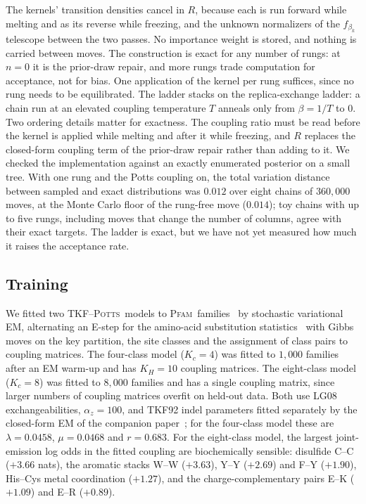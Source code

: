 \documentclass[11pt]{article}
\newcommand{\Potts}{\textsc{TKF--Potts}}
\newcommand{\Pfam}{\textsc{Pfam}}
\begin{document}
The kernels' transition densities cancel in $R$, because each is run forward
while melting and as its reverse while freezing, and the unknown normalizers
of the $f_{\beta_k}$ telescope between the two passes. No importance weight is
stored, and nothing is carried between moves. The construction is exact for
any number of rungs: at $n=0$ it is the prior-draw repair, and more rungs
trade computation for acceptance, not for bias. One application of the kernel
per rung suffices, since no rung needs to be equilibrated. The ladder stacks
on the replica-exchange ladder: a chain run at an elevated coupling
temperature $T$ anneals only from $\beta=1/T$ to $0$. Two ordering details
matter for exactness. The coupling ratio must be read before the kernel is
applied while melting and after it while freezing, and $R$ replaces the
closed-form coupling term of the prior-draw repair rather than adding to it.
We checked the implementation against an exactly enumerated posterior on a
small tree. With one rung and the Potts coupling on, the total variation
distance between sampled and exact distributions was $0.012$ over eight
chains of $360{,}000$ moves, at the Monte Carlo floor of the rung-free move
($0.014$); toy chains with up to five rungs, including moves that change the
number of columns, agree with their exact targets. The ladder is exact, but
we have not yet measured how much it raises the acceptance rate.

\subsection{Training}
\label{sec:training}

We fitted two \Potts\ models to \Pfam\ families~\citep{Pfam2021}
by stochastic variational EM, alternating an E-step for the amino-acid
substitution statistics~\citep{LargeHolmes2026Coupled} with Gibbs moves on the
key partition, the site classes and the assignment of class pairs to
coupling matrices. The four-class model ($K_c=4$) was fitted to $1{,}000$
families after an EM warm-up and has $K_H=10$ coupling matrices. The
eight-class model ($K_c=8$) was fitted to $8{,}000$ families and has a single
coupling matrix, since larger numbers of coupling matrices overfit on held-out
data. Both use LG08 exchangeabilities, $\alpha_z=100$, and TKF92 indel
parameters fitted separately by the closed-form EM of the companion
paper~\citep{HolmesLarge2026BW}; for the four-class model these are
$\lambda=0.0458$, $\mu=0.0468$ and $r=0.683$. For the eight-class model,
the largest joint-emission log odds in the fitted coupling are biochemically
sensible: disulfide C--C ($+3.66$ nats), the aromatic stacks W--W ($+3.63$),
Y--Y ($+2.69$) and F--Y ($+1.90$), His--Cys metal coordination ($+1.27$), and the
charge-complementary pairs E--K ($+1.09$) and E--R ($+0.89$).
\end{document}
